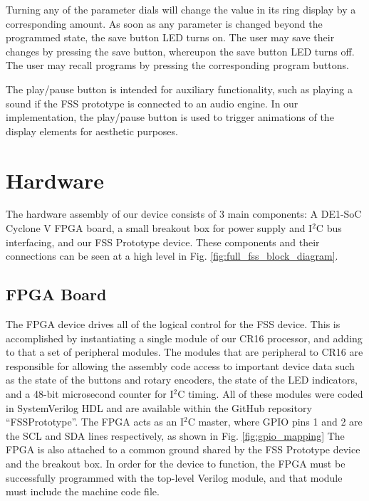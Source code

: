 \documentclass[conference]{IEEEtran}
\begin{document}
Turning any of the parameter dials will change the value in its ring display by a corresponding amount. As soon as any parameter is changed beyond the programmed state, the save button LED turns on. The user may save their changes by pressing the save button, whereupon the save button LED turns off. The user may recall programs by pressing the corresponding program buttons.

The play/pause button is intended for auxiliary functionality, such as playing a sound if the FSS prototype is connected to an audio engine. In our implementation, the play/pause button is used to trigger animations of the display elements for aesthetic purposes.

\section{Hardware}
The hardware assembly of our device consists of 3 main components: A DE1-SoC Cyclone V FPGA board, a small breakout box for power supply and I$^2$C bus interfacing, and our FSS Prototype device. These components and their connections can be seen at a high level in Fig. \ref{fig:full_fss_block_diagram}.

\subsection{FPGA Board}
The FPGA device drives all of the logical control for the FSS device. This is accomplished by instantiating a single module of our CR16 processor, and adding to that a set of peripheral modules. The modules that are peripheral to CR16 are responsible for allowing the assembly code access to important device data such as the state of the buttons and rotary encoders, the state of the LED indicators, and a 48-bit microsecond counter for I$^2$C timing. All of these modules were coded in SystemVerilog HDL and are available within the GitHub repository ``FSSPrototype''. The FPGA acts as an I$^2$C master, where GPIO pins 1 and 2 are the SCL and SDA lines respectively, as shown in Fig. \ref{fig:gpio_mapping} The FPGA is also attached to a common ground shared by the FSS Prototype device and the breakout box. In order for the device to function, the FPGA must be successfully programmed with the  top-level Verilog module, and that module must include the  machine code file.
\end{document}
